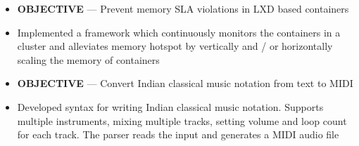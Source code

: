\documentclass[10pt,a4paper]{altacv}
\begin{document}
\begin{itemize}
	\item \textbf{OBJECTIVE} --- Prevent memory SLA violations in LXD based containers
	\item Implemented a framework which continuously monitors the containers in a cluster and alleviates memory hotspot by vertically and / or horizontally scaling the memory of containers
\end{itemize}

\divider

\begin{itemize}
	\item \textbf{OBJECTIVE} --- Convert Indian classical music notation from text to MIDI
	\item Developed syntax for writing Indian classical music notation. Supports multiple instruments, mixing multiple tracks, setting volume and loop count for each track. The parser reads the input and generates a MIDI audio file
\end{itemize}

\end{document}
